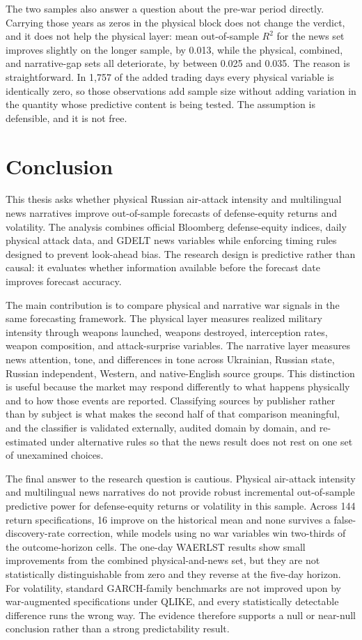 \documentclass[12pt,a4paper]{article}
\begin{document}
The two samples also answer a question about the pre-war period directly. Carrying those years as zeros in the physical block does not change the verdict, and it does not help the physical layer: mean out-of-sample $R^2$ for the news set improves slightly on the longer sample, by 0.013, while the physical, combined, and narrative-gap sets all deteriorate, by between 0.025 and 0.035. The reason is straightforward. In 1,757 of the added trading days every physical variable is identically zero, so those observations add sample size without adding variation in the quantity whose predictive content is being tested. The assumption is defensible, and it is not free.

\section{Conclusion}

This thesis asks whether physical Russian air-attack intensity and multilingual news narratives improve out-of-sample forecasts of defense-equity returns and volatility. The analysis combines official Bloomberg defense-equity indices, daily physical attack data, and GDELT news variables while enforcing timing rules designed to prevent look-ahead bias. The research design is predictive rather than causal: it evaluates whether information available before the forecast date improves forecast accuracy.

The main contribution is to compare physical and narrative war signals in the same forecasting framework. The physical layer measures realized military intensity through weapons launched, weapons destroyed, interception rates, weapon composition, and attack-surprise variables. The narrative layer measures news attention, tone, and differences in tone across Ukrainian, Russian state, Russian independent, Western, and native-English source groups. This distinction is useful because the market may respond differently to what happens physically and to how those events are reported. Classifying sources by publisher rather than by subject is what makes the second half of that comparison meaningful, and the classifier is validated externally, audited domain by domain, and re-estimated under alternative rules so that the news result does not rest on one set of unexamined choices.

The final answer to the research question is cautious. Physical air-attack intensity and multilingual news narratives do not provide robust incremental out-of-sample predictive power for defense-equity returns or volatility in this sample. Across 144 return specifications, 16 improve on the historical mean and none survives a false-discovery-rate correction, while models using no war variables win two-thirds of the outcome-horizon cells. The one-day WAERLST results show small improvements from the combined physical-and-news set, but they are not statistically distinguishable from zero and they reverse at the five-day horizon. For volatility, standard GARCH-family benchmarks are not improved upon by war-augmented specifications under QLIKE, and every statistically detectable difference runs the wrong way. The evidence therefore supports a null or near-null conclusion rather than a strong predictability result.
\end{document}

